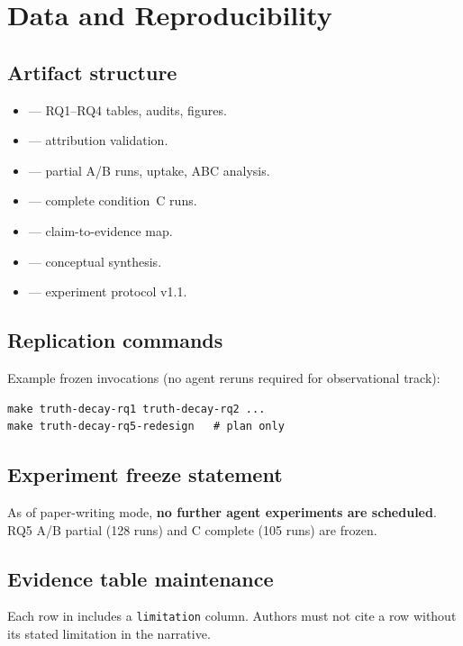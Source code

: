 \section{Data and Reproducibility}
\label{sec:reproducibility}

\subsection{Artifact structure}
\begin{itemize}
  \item {} --- RQ1--RQ4 tables, audits, figures.
  \item {} --- attribution validation.
  \item {} --- partial A/B runs, uptake, ABC analysis.
  \item {} --- complete condition~C runs.
  \item {} --- claim-to-evidence map.
  \item {} --- conceptual synthesis.
  \item {} --- experiment protocol v1.1.
\end{itemize}

\subsection{Replication commands}
Example frozen invocations (no agent reruns required for observational track):
\begin{verbatim}
make truth-decay-rq1 truth-decay-rq2 ...
make truth-decay-rq5-redesign   # plan only
\end{verbatim}

\subsection{Experiment freeze statement}
As of paper-writing mode, \textbf{no further agent experiments are scheduled}.
RQ5 A/B partial (128 runs) and C complete (105 runs) are frozen.

\subsection{Evidence table maintenance}
Each row in  includes a \texttt{limitation} column.
Authors must not cite a row without its stated limitation in the narrative.
